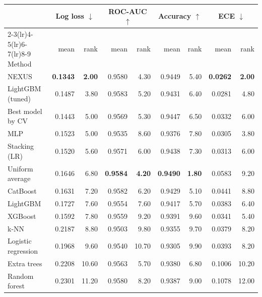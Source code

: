 \begin{tabular}{lrrrrrrrr}
\toprule
& \multicolumn{2}{c}{Log loss $\downarrow$} & \multicolumn{2}{c}{ROC-AUC $\uparrow$} & \multicolumn{2}{c}{Accuracy $\uparrow$} & \multicolumn{2}{c}{ECE $\downarrow$}\\
\cmidrule(lr){2-3}\cmidrule(lr){4-5}\cmidrule(lr){6-7}\cmidrule(lr){8-9}
Method & mean & rank & mean & rank & mean & rank & mean & rank\\
\midrule
NEXUS & \textbf{0.1343} & \textbf{2.00} & 0.9580 & 4.30 & 0.9449 & 5.40 & \textbf{0.0262} & \textbf{2.00}\\
LightGBM (tuned) & 0.1487 & 3.80 & 0.9583 & 5.20 & 0.9431 & 6.40 & 0.0281 & 4.80\\
Best model by CV & 0.1443 & 5.00 & 0.9569 & 5.30 & 0.9447 & 6.50 & 0.0332 & 6.00\\
MLP & 0.1523 & 5.00 & 0.9535 & 8.60 & 0.9376 & 7.80 & 0.0305 & 3.80\\
Stacking (LR) & 0.1520 & 5.60 & 0.9571 & 6.00 & 0.9438 & 7.30 & 0.0313 & 6.00\\
Uniform average & 0.1646 & 6.80 & \textbf{0.9584} & \textbf{4.20} & \textbf{0.9490} & \textbf{1.80} & 0.0583 & 9.20\\
CatBoost & 0.1631 & 7.20 & 0.9582 & 6.20 & 0.9429 & 5.10 & 0.0441 & 8.80\\
LightGBM & 0.1727 & 7.60 & 0.9554 & 7.60 & 0.9417 & 5.70 & 0.0383 & 6.40\\
XGBoost & 0.1592 & 7.80 & 0.9559 & 9.20 & 0.9391 & 9.60 & 0.0341 & 5.40\\
k-NN & 0.2187 & 8.80 & 0.9503 & 9.80 & 0.9355 & 9.70 & 0.0379 & 8.20\\
Logistic regression & 0.1968 & 9.60 & 0.9540 & 10.70 & 0.9305 & 9.90 & 0.0393 & 8.20\\
Extra trees & 0.2208 & 10.60 & 0.9563 & 5.70 & 0.9380 & 6.80 & 0.1006 & 10.20\\
Random forest & 0.2301 & 11.20 & 0.9580 & 8.20 & 0.9387 & 9.00 & 0.1078 & 12.00\\
\bottomrule
\end{tabular}
